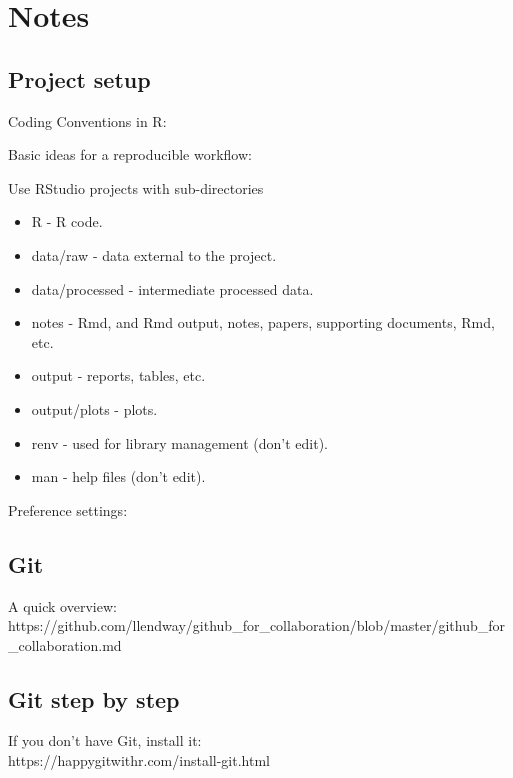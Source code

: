 \documentclass[
  letterpaper,
  DIV=11,
  numbers=noendperiod]{scrreport}
\providecommand{\tightlist}{%
  \setlength{\itemsep}{0pt}\setlength{\parskip}{0pt}}\usepackage{longtable,booktabs,array}
\begin{document}

\hypertarget{notes}{%
\chapter{Notes}\label{notes}}

\hypertarget{project-setup-1}{%
\section{Project setup}\label{project-setup-1}}

Coding Conventions in R:

Basic ideas for a reproducible workflow:

Use RStudio projects with sub-directories

\begin{itemize}
\tightlist
\item
  R - R code.
\item
  data/raw - data external to the project.
\item
  data/processed - intermediate processed data.
\item
  notes - Rmd, and Rmd output, notes, papers, supporting documents, Rmd,
  etc.
\item
  output - reports, tables, etc.
\item
  output/plots - plots.
\item
  renv - used for library management (don't edit).
\item
  man - help files (don't edit).
\end{itemize}

Preference settings:

\hypertarget{git-1}{%
\section{Git}\label{git-1}}

A quick overview:
https://github.com/llendway/github\_for\_collaboration/blob/master/github\_for\_collaboration.md

\hypertarget{git-step-by-step-1}{%
\section{Git step by step}\label{git-step-by-step-1}}

If you don't have Git, install it:\\
https://happygitwithr.com/install-git.html
\end{document}
